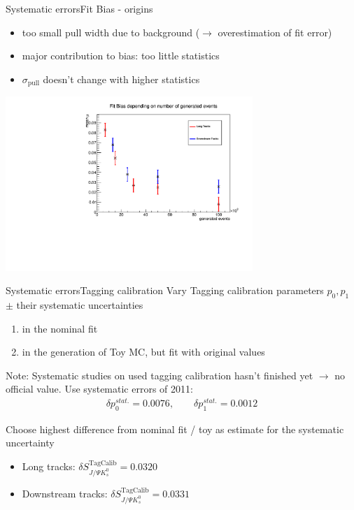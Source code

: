 \documentclass{beamer}
\newcommand{\SJPsi}{S_{J/\Psi K_s^0}}
\begin{document}
	\begin{frame}{Systematic errors}{Fit Bias - origins}
    \begin{itemize}
    \item too small pull width due to background ($\rightarrow$ overestimation of fit error)
    \item major contribution to bias: too little statistics
    \item $\sigma_{\text{pull}}$ doesn't change with higher statistics
    \end{itemize}
    \begin{center}
    \includegraphics[width = 0.7\textwidth]{fit_bias_statistics}
    \end{center}
    \end{frame}
	
	\begin{frame}{Systematic errors}{Tagging calibration}
	Vary Tagging calibration parameters $p_0, p_1$ $\pm$ their systematic uncertainties
	\begin{enumerate}
	\item in the nominal fit
	\item in the generation of Toy MC, but fit with original values
	\end{enumerate}
	\begin{alert}{Note:}
	Systematic studies on used tagging calibration hasn't finished yet $\longrightarrow$ no official value. Use systematic errors of 2011:
	\begin{align*}
	\delta p_0^{stat.} = 0.0076, \qquad \delta p_1^{stat.} = 0.0012
	\end{align*}
	\end{alert}
	Choose highest difference from nominal fit / toy as estimate for the systematic uncertainty
	\begin{itemize}
	\item Long tracks: $\delta\SJPsi^{\text{TagCalib}} = 0.0320$
	\item Downstream tracks: $\delta\SJPsi^{\text{TagCalib}} = 0.0331$
    \end{itemize}		    
    \end{frame}
    
\end{document}

